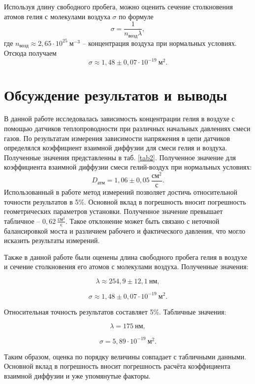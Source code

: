 \documentclass[a4paper, 12pt]{article}
\begin{document}
Используя длину свободного пробега, можно оценить сечение столкновения атомов гелия с молекулами воздуха $\sigma$ по формуле
\begin{equation}\label{sigma}
\sigma = \frac{1}{n_{возд}\lambda},
\end{equation}
где $n_{возд} \approx 2,65 \cdot 10^{25}~м^{-3}$ -- концентрация воздуха при нормальных условиях. Отсюда получаем
\[\boxed{\sigma \approx 1,48\pm0,07 \cdot 10^{-19}~м^2}.\]

\section{Обсуждение результатов и выводы}

В данной работе исследовалась зависимость концентрации гелия в воздухе с помощью датчиков теплопроводности при различных начальных давлениях смеси газов. По результатам измерения зависимости напряжения в цепи датчиков определялся коэффициент взаимной диффузии для смеси гелия и воздуха. Полученные значения представленны в таб. \ref{tab2}. Полученное значение для коэффициента взаимной диффузии смеси гелий-воздух при нормальных условиях:
\[\boxed{D_{атм} = 1,06\pm0,05~\frac{см^2}{с}}.\]
Использованный в работе метод измерений позволяет достичь относительной точности результатов в 5\%. Основной вклад в погрешность вносит погрешность геометрических параметров установки. Полученное значение превышает табличное -- $0,62~\frac{см^2}{с}$. Такое отклонение может быть связано с неточной балансировкой моста и различием рабочего и фактического давления, что могло исказить результаты измерений.

Также в данной работе были оценены длина свободного пробега гелия в воздухе  и сечение столкновения его атомов с молекулами воздуха. Полученные значения:

\[\boxed{\lambda \approx 254,9\pm12,1~нм},\]

\[\boxed{\sigma \approx 1,48\pm0,07 \cdot 10^{-19}~м^2}.\]

Относительная точность результатов составляет 5\%. Табличные значения:

\[\lambda = 175~нм,\]

\[\sigma = 5,89 \cdot 10^{-19}~м^2.\]

Таким образом, оценка по порядку величины совпадает с табличными данными. Основной вклад в погрешность вносит погрешность расчёта коэффициента взаимной диффузии и уже упомянутые факторы.
\end{document}
